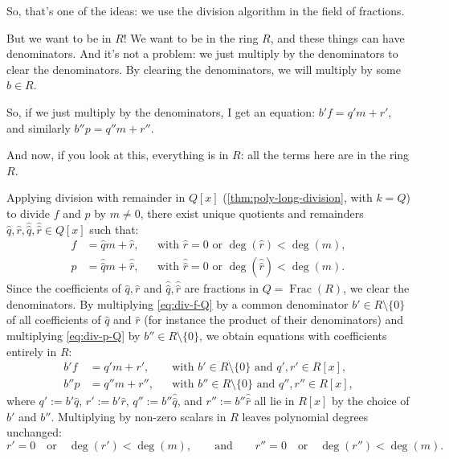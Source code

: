 \begin{proofWrapper}
\begin{speech}[00:39:16 - 00:41:26]
So, that's one of the ideas: we use the division algorithm in the field of fractions.

But we want to be in $R$! We want to be in the ring $R$, and these things can have denominators. And it's not a problem: we just multiply by the denominators to clear the denominators. By clearing the denominators, we will multiply by some $b \in R$. 

So, if we just multiply by the denominators, I get an equation: $b' f = q' m + r'$,  and similarly $b'' p = q'' m + r''$. 

And now, if you look at this, everything is in $R$: all the terms here are in the ring $R$. 
\end{speech}

\begin{content}
Applying division with remainder in $Q[x]$ (\cref{thm:poly-long-division}, with $k = Q$) to divide $f$ and $p$ by $m \neq 0$, there exist unique quotients and remainders $\hat{q}, \hat{r}, \hat{\hat{q}}, \hat{\hat{r}} \in Q[x]$ such that:
\begin{align}
f &= \hat{q} m + \hat{r}, && \text{with } \hat{r} = 0 \text{ or } \deg(\hat{r}) < \deg(m), \label{eq:div-f-Q} \\
p &= \hat{\hat{q}} m + \hat{\hat{r}}, && \text{with } \hat{\hat{r}} = 0 \text{ or } \deg(\hat{\hat{r}}) < \deg(m). \label{eq:div-p-Q}
\end{align}
Since the coefficients of $\hat{q}, \hat{r}$ and $\hat{\hat{q}}, \hat{\hat{r}}$ are fractions in $Q = \operatorname{Frac}(R)$, we clear the denominators. By multiplying \eqref{eq:div-f-Q} by a common denominator $b' \in R \setminus \{0\}$ of all coefficients of $\hat{q}$ and $\hat{r}$ (for instance the product of their denominators) and multiplying \eqref{eq:div-p-Q} by $b'' \in R \setminus \{0\}$, we obtain equations with coefficients entirely in $R$:
\begin{align}
b' f &= q' m + r', && \text{with } b' \in R \setminus \{0\} \text{ and } q', r' \in R[x], \label{eq:cleared-f-div} \\
b'' p &= q'' m + r'', && \text{with } b'' \in R \setminus \{0\} \text{ and } q'', r'' \in R[x], \label{eq:cleared-p-div}
\end{align}
where $q' := b' \hat{q}$, $r' := b' \hat{r}$, $q'' := b'' \hat{\hat{q}}$, and $r'' := b'' \hat{\hat{r}}$ all lie in $R[x]$ by the choice of $b'$ and $b''$.
Multiplying by non-zero scalars in $R$ leaves polynomial degrees unchanged:
\[
r' = 0 \quad \text{or} \quad \deg(r') < \deg(m), \qquad \text{and} \qquad r'' = 0 \quad \text{or} \quad \deg(r'') < \deg(m).
\]
\end{content}


\end{proofWrapper}

